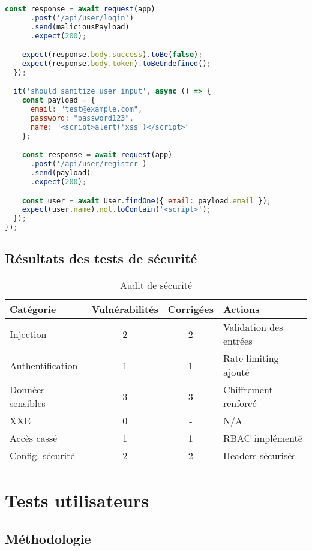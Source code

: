 \begin{table}[h]
\begin{table}[h]
\begin{table}[h]
\begin{lstlisting}[language=JavaScript, caption=Test d'injection NoSQL]
    const response = await request(app)
      .post('/api/user/login')
      .send(maliciousPayload)
      .expect(200);

    expect(response.body.success).toBe(false);
    expect(response.body.token).toBeUndefined();
  });

  it('should sanitize user input', async () => {
    const payload = {
      email: "test@example.com",
      password: "password123",
      name: "<script>alert('xss')</script>"
    };

    const response = await request(app)
      .post('/api/user/register')
      .send(payload)
      .expect(200);

    const user = await User.findOne({ email: payload.email });
    expect(user.name).not.toContain('<script>');
  });
});
\end{lstlisting}

\subsection{Résultats des tests de sécurité}

\begin{table}[h]
\centering
\begin{tabular}{|l|c|c|p{4cm}|}
\hline
\textbf{Catégorie} & \textbf{Vulnérabilités} & \textbf{Corrigées} & \textbf{Actions} \\
\hline
Injection & 2 & 2 & Validation des entrées \\
\hline
Authentification & 1 & 1 & Rate limiting ajouté \\
\hline
Données sensibles & 3 & 3 & Chiffrement renforcé \\
\hline
XXE & 0 & - & N/A \\
\hline
Accès cassé & 1 & 1 & RBAC implémenté \\
\hline
Config. sécurité & 2 & 2 & Headers sécurisés \\
\hline
\end{tabular}
\caption{Audit de sécurité}
\label{tab:security_audit}
\end{table}

\section{Tests utilisateurs}

\subsection{Méthodologie}


\end{table}
\end{table}
\end{table}
